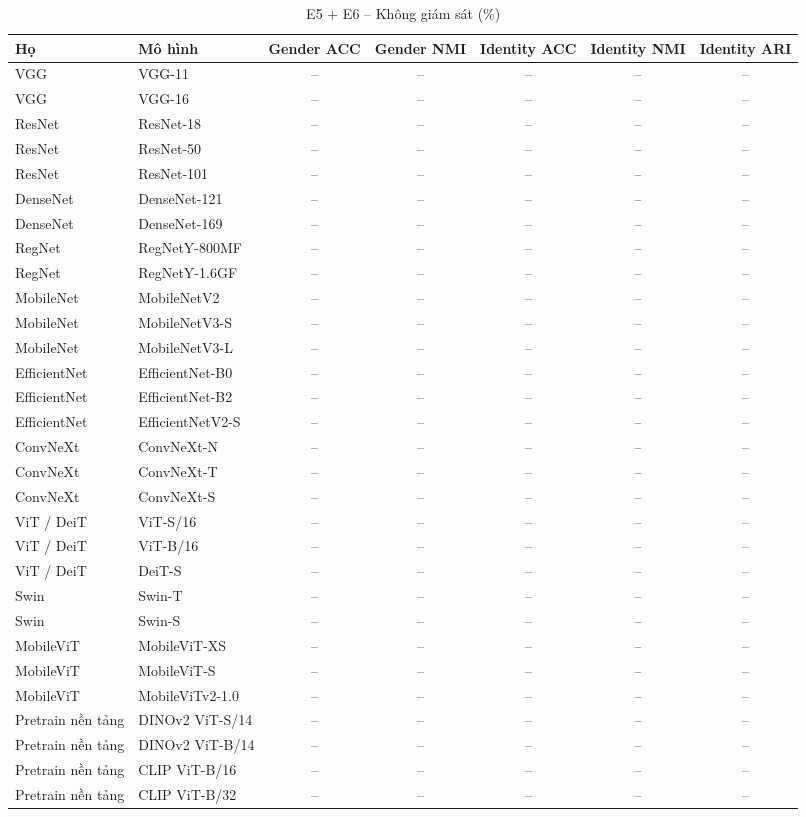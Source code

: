 \begin{table}[t]
\centering
\small
\caption{E5 + E6 – Không giám sát (\%)}
\begin{tabular}{llccccc}
\toprule
Họ & Mô hình & Gender ACC & Gender NMI & Identity ACC & Identity NMI & Identity ARI \\
\midrule
VGG & VGG-11 & – & – & – & – & – \\
VGG & VGG-16 & – & – & – & – & – \\
ResNet & ResNet-18 & – & – & – & – & – \\
ResNet & ResNet-50 & – & – & – & – & – \\
ResNet & ResNet-101 & – & – & – & – & – \\
DenseNet & DenseNet-121 & – & – & – & – & – \\
DenseNet & DenseNet-169 & – & – & – & – & – \\
RegNet & RegNetY-800MF & – & – & – & – & – \\
RegNet & RegNetY-1.6GF & – & – & – & – & – \\
MobileNet & MobileNetV2 & – & – & – & – & – \\
MobileNet & MobileNetV3-S & – & – & – & – & – \\
MobileNet & MobileNetV3-L & – & – & – & – & – \\
EfficientNet & EfficientNet-B0 & – & – & – & – & – \\
EfficientNet & EfficientNet-B2 & – & – & – & – & – \\
EfficientNet & EfficientNetV2-S & – & – & – & – & – \\
ConvNeXt & ConvNeXt-N & – & – & – & – & – \\
ConvNeXt & ConvNeXt-T & – & – & – & – & – \\
ConvNeXt & ConvNeXt-S & – & – & – & – & – \\
ViT / DeiT & ViT-S/16 & – & – & – & – & – \\
ViT / DeiT & ViT-B/16 & – & – & – & – & – \\
ViT / DeiT & DeiT-S & – & – & – & – & – \\
Swin & Swin-T & – & – & – & – & – \\
Swin & Swin-S & – & – & – & – & – \\
MobileViT & MobileViT-XS & – & – & – & – & – \\
MobileViT & MobileViT-S & – & – & – & – & – \\
MobileViT & MobileViTv2-1.0 & – & – & – & – & – \\
Pretrain nền tảng & DINOv2 ViT-S/14 & – & – & – & – & – \\
Pretrain nền tảng & DINOv2 ViT-B/14 & – & – & – & – & – \\
Pretrain nền tảng & CLIP ViT-B/16 & – & – & – & – & – \\
Pretrain nền tảng & CLIP ViT-B/32 & – & – & – & – & – \\
\bottomrule
\end{tabular}
\end{table}
